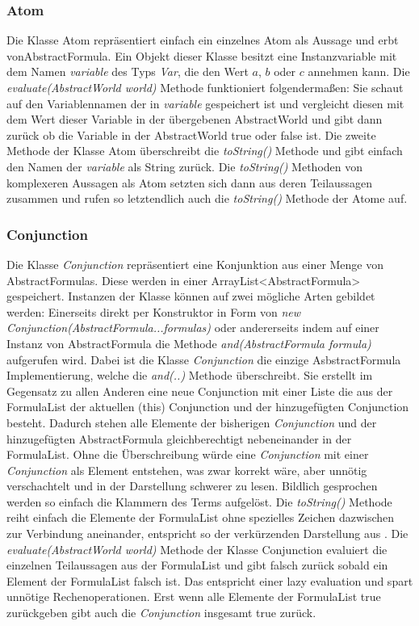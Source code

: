 \documentclass[12pt,a4paper]{article}
\begin{document}
\subsubsection{Atom}


Die Klasse Atom repräsentiert einfach ein einzelnes Atom als Aussage und erbt vonAbstractFormula. Ein Objekt dieser Klasse besitzt eine Instanzvariable mit dem Namen \textit{variable} des Typs \textit{Var}, die den Wert $a$, $b$ oder $c$ annehmen kann. Die \textit{evaluate(AbstractWorld world)} Methode funktioniert folgendermaßen: Sie schaut auf den Variablennamen der in \textit{variable} gespeichert ist und vergleicht diesen mit dem Wert dieser Variable in der übergebenen AbstractWorld und gibt dann zurück ob die Variable in der AbstractWorld true oder false ist. Die zweite Methode der Klasse Atom überschreibt die \textit{toString()} Methode und gibt einfach den Namen der \textit{variable} als String zurück. Die \textit{toString()} Methoden von komplexeren Aussagen als Atom setzten sich dann aus deren Teilaussagen zusammen und rufen so letztendlich auch die \textit{toString()} Methode der Atome auf.


\subsubsection{Conjunction}
Die Klasse \textit{Conjunction} repräsentiert eine Konjunktion aus einer Menge von AbstractFormulas. Diese werden in einer ArrayList<AbstractFormula> gespeichert. Instanzen der Klasse können auf zwei mögliche Arten gebildet werden: Einerseits direkt per Konstruktor in Form von \textit{new Conjunction(AbstractFormula...formulas)} oder andererseits indem auf einer Instanz von AbstractFormula die Methode \textit{and(AbstractFormula formula)} aufgerufen wird. Dabei ist die Klasse \textit{Conjunction} die einzige AsbstractFormula Implementierung, welche die \textit{and(..)} Methode überschreibt. Sie erstellt im Gegensatz zu allen Anderen eine neue Conjunction mit einer Liste die aus der FormulaList der aktuellen (this) Conjunction und der hinzugefügten Conjunction besteht. Dadurch stehen alle Elemente der bisherigen \textit{Conjunction} und der hinzugefügten AbstractFormula gleichberechtigt nebeneinander in der FormulaList. Ohne die Überschreibung würde eine \textit{Conjunction} mit einer \textit{Conjunction} als Element entstehen, was zwar korrekt wäre, aber unnötig verschachtelt und in der Darstellung schwerer zu lesen. Bildlich gesprochen werden so einfach die Klammern des Terms aufgelöst. Die \textit{toString()} Methode reiht einfach die Elemente der FormulaList ohne spezielles Zeichen dazwischen zur Verbindung aneinander, entspricht so der verkürzenden Darstellung aus \cite{beierle19}. Die \textit{evaluate(AbstractWorld world)} Methode der Klasse Conjunction evaluiert die einzelnen Teilaussagen aus der FormulaList und gibt falsch zurück sobald ein Element der FormulaList falsch ist. Das entspricht einer lazy evaluation und spart unnötige Rechenoperationen. Erst wenn alle Elemente der FormulaList true zurückgeben gibt auch die \textit{Conjunction} insgesamt true zurück.
\end{document}

